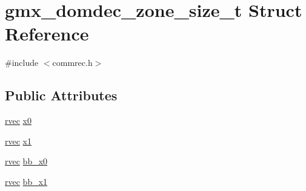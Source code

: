 \hypertarget{structgmx__domdec__zone__size__t}{\section{gmx\-\_\-domdec\-\_\-zone\-\_\-size\-\_\-t \-Struct \-Reference}
\label{structgmx__domdec__zone__size__t}
}


{\ttfamily \#include $<$commrec.\-h$>$}

\subsection*{\-Public \-Attributes}
\begin{DoxyCompactItemize}
\item 
\hyperlink{share_2template_2gromacs_2types_2simple_8h_aa02a552a4abd2f180c282a083dc3a999}{rvec} \hyperlink{structgmx__domdec__zone__size__t_abc6646c2c36ad6d612514346b892d31f}{x0}
\item 
\hyperlink{share_2template_2gromacs_2types_2simple_8h_aa02a552a4abd2f180c282a083dc3a999}{rvec} \hyperlink{structgmx__domdec__zone__size__t_af0bee95d21f308741535223757192890}{x1}
\item 
\hyperlink{share_2template_2gromacs_2types_2simple_8h_aa02a552a4abd2f180c282a083dc3a999}{rvec} \hyperlink{structgmx__domdec__zone__size__t_aba0d4cf17c1c939e57568a406d9981b4}{bb\-\_\-x0}
\item 
\hyperlink{share_2template_2gromacs_2types_2simple_8h_aa02a552a4abd2f180c282a083dc3a999}{rvec} \hyperlink{structgmx__domdec__zone__size__t_ab4e5c8c456aeddbe6ffbc63128c1c755}{bb\-\_\-x1}
\end{DoxyCompactItemize}


